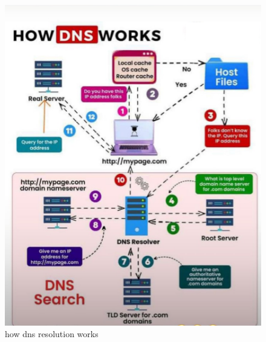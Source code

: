 \begin{figure}[ht!]
	\centering
	\includegraphics[width=0.8\linewidth]{chap1/images/image dns good.png}
	\caption{how dns resolution works}
	\label{fig:enter-labeel1}
\end{figure}

